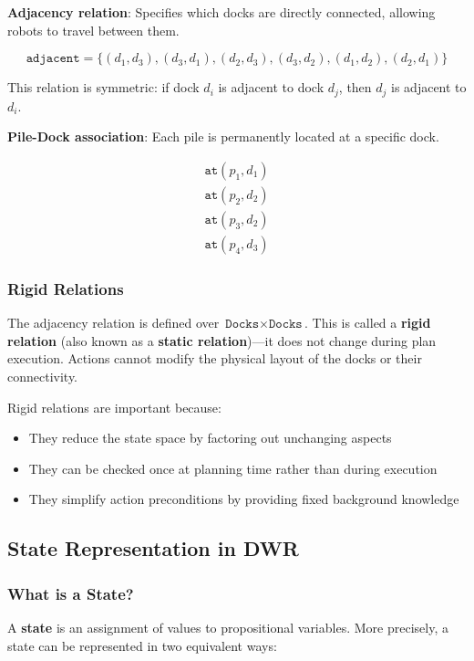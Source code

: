 \documentclass[11pt,a4paper]{article}
\theoremstyle{definition}
\theoremstyle{plain}
\theoremstyle{remark}
\begin{document}
\textbf{Adjacency relation}: Specifies which docks are directly connected, allowing robots to travel between them.

\[
\texttt{adjacent} = \{(d_1, d_3), (d_3, d_1), (d_2, d_3), (d_3, d_2), (d_1, d_2), (d_2, d_1)\}
\]

This relation is symmetric: if dock $d_i$ is adjacent to dock $d_j$, then $d_j$ is adjacent to $d_i$.

\textbf{Pile-Dock association}: Each pile is permanently located at a specific dock.

\[
\begin{array}{l}
\texttt{at}(p_1, d_1) \\
\texttt{at}(p_2, d_2) \\
\texttt{at}(p_3, d_2) \\
\texttt{at}(p_4, d_3)
\end{array}
\]

\subsubsection{Rigid Relations}

The adjacency relation is defined over $\texttt{Docks} \times \texttt{Docks}$. This is called a \textbf{rigid relation} (also known as a \textbf{static relation})—it does not change during plan execution. Actions cannot modify the physical layout of the docks or their connectivity.

Rigid relations are important because:
\begin{itemize}
    \item They reduce the state space by factoring out unchanging aspects
    \item They can be checked once at planning time rather than during execution
    \item They simplify action preconditions by providing fixed background knowledge
\end{itemize}

\subsection{State Representation in DWR}

\subsubsection{What is a State?}

A \textbf{state} is an assignment of values to propositional variables. More precisely, a state can be represented in two equivalent ways:
\end{document}
